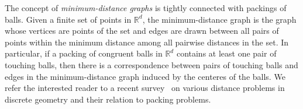
The concept of \emph{minimum-distance graphs} is tightly connected with packings of balls.
Given a finite set of points in $\mathbb{R}^d$, the minimum-distance graph is the graph whose vertices are points of the set and edges are drawn between all pairs of points within the minimum distance among all pairwise distances in the set. In particular, if a packing of congruent balls in $\mathbb{R}^d$ contains at least one pair of touching balls, then there is a correspondence between pairs of touching balls and edges in the minimum-distance graph induced by the centeres of the balls. %
We refer the interested reader to a recent survey~\cite{Swanepoel2018} on various distance problems in discrete geometry and their relation to packing problems.


